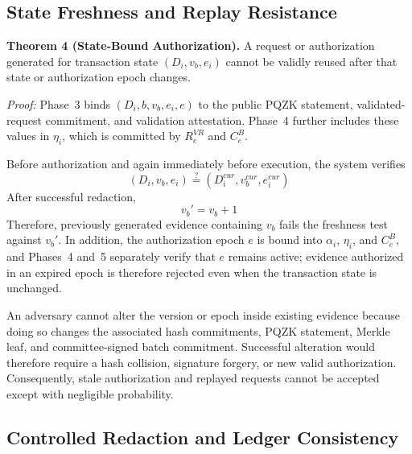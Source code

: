 \documentclass[lettersize,journal]{IEEEtran}
\begin{document}
    
    
    \subsection{State Freshness and Replay Resistance}
    
    \textbf{Theorem 4 (State-Bound Authorization).}
    A request or authorization generated for transaction state
    $(D_i,v_b,e_i)$ cannot be validly reused after that state or
    authorization epoch changes.
    
    \emph{Proof:}
    Phase~3 binds $(D_i,b,v_b,e_i {,e})$ to the public PQZK statement,
    validated-request commitment, and validation attestation. Phase~4
    further includes these values in $\eta_i$, which is committed by
    $R_e^{VR}$ and $C_e^B$.
    
    Before authorization and again immediately before execution, the
    system verifies
    \begin{equation}
    { (D_i,v_b,e_i)
    \stackrel{?}{=}
    (D_i^{cur},v_b^{cur},e_i^{cur})}
    \label{eq:sec_state_fresh}
    \end{equation}
    After successful redaction,
    \begin{equation}
    v_b'=v_b+1
    \label{eq:sec_version_update}
    \end{equation}
    Therefore, previously generated evidence containing $v_b$ fails the
    freshness test against $v_b'$.  {In addition, the
    authorization epoch $e$ is bound into $\alpha_i$, $\eta_i$, and $C_e^B$,
    and Phases~4 and~5 separately verify that $e$ remains active; evidence
    authorized in an expired epoch is therefore rejected even when the
    transaction state is unchanged.}
    
    An adversary cannot alter the version or epoch inside existing
    evidence because doing so changes the associated hash commitments,
    PQZK statement, Merkle leaf, and committee-signed batch commitment.
    Successful alteration would therefore require a hash collision,
    signature forgery, or new valid authorization. Consequently, stale
    authorization and replayed requests cannot be accepted except with
    negligible probability.
     
    
    
    \subsection{Controlled Redaction and Ledger Consistency}
    
\end{document}

